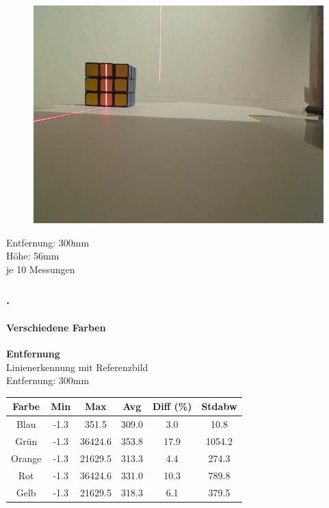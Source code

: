 \documentclass[xcolor=dvipsnames]{beamer}
\def\frametitlesec{\frametitle{\arabic{section}.\hspace{0.5ex}\insertsection}}
\def\framesubtitles#1{\framesubtitle{\hspace{3.5ex}#1}}
\begin{document}
\begin{frame}
\begin{figure}
\begin{minipage}{0.32\linewidth}
		\end{minipage}
		\hfill
		\begin{minipage}{0.32\linewidth}
			\includegraphics[width=\linewidth]{includes/test_color_3}
		\end{minipage}
	\end{figure}
	
	Entfernung: 300mm\\
	Höhe: 56mm\\
	je 10 Messungen
	
\end{frame}
	
\begin{frame}
	\frametitlesec
	\framesubtitles{Verschiedene Farben}
		\textbf{Entfernung}\\
		
		Linienerkennung mit Referenzbild\\
		Entfernung: 300mm
		\begin{tabular}{c|c|c|c|c|c}
			Farbe & Min & Max & Avg & Diff (\%) & Stdabw\\ \hline
Blau &-1.3 & 351.5 & 309.0 & 3.0 & 10.8\\
Grün &-1.3 & 36424.6 & 353.8 & 17.9 & 1054.2\\
Orange &-1.3 & 21629.5 & 313.3 & 4.4 & 274.3\\
Rot &-1.3 & 36424.6 & 331.0 & 10.3 & 789.8\\
Gelb &-1.3 & 21629.5 & 318.3 & 6.1 & 379.5\\
		\end{tabular}
		
\end{frame}
\end{document}

